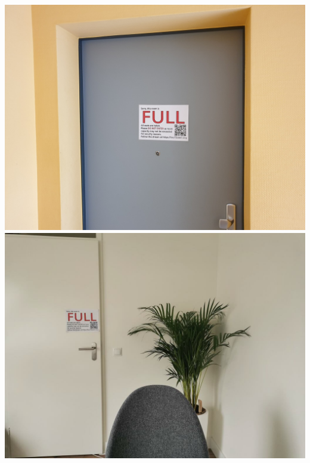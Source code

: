\documentclass[aspectratio=169]{beamer}
\begin{document}
\begin{frame}
	\begin{center}
	\vfill
		\includegraphics[scale=0.12]{images/fosdem_home_2_768.jpg}
		\includegraphics[scale=0.12]{images/fosdem_home_6_768.jpg}
	\vfill
	\end{center}
\end{frame}
\end{document}
